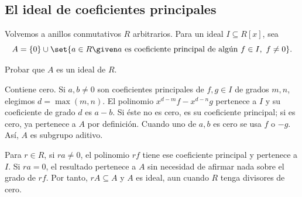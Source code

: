 \subsection{El ideal de coeficientes principales}
Volvemos a anillos conmutativos $R$ arbitrarios. Para un ideal $I\subseteq R[x]$, sea
\[
A=\{0\}\cup\set{a\in R\given
a\text{ es coeficiente principal de algún }f\in I,\ f\ne0}.
\]
\begin{ejer}\label{ejer:C15-principales}
Probar que $A$ es un ideal de $R$.
\end{ejer}
\begin{sol}
Contiene cero. Si $a,b\ne0$ son coeficientes principales de $f,g\in I$ de grados $m,n$, elegimos $d=\max(m,n)$. El polinomio $x^{d-m}f-x^{d-n}g$ pertenece a $I$ y su coeficiente de grado $d$ es $a-b$. Si éste no es cero, es su coeficiente principal; si es cero, ya pertenece a $A$ por definición. Cuando uno de $a,b$ es cero se usa $f$ o $-g$. Así, $A$ es subgrupo aditivo.

Para $r\in R$, si $ra\ne0$, el polinomio $rf$ tiene ese coeficiente principal y pertenece a $I$. Si $ra=0$, el resultado pertenece a $A$ sin necesidad de afirmar nada sobre el grado de $rf$. Por tanto, $rA\subseteq A$ y $A$ es ideal, aun cuando $R$ tenga divisores de cero.
\end{sol}

